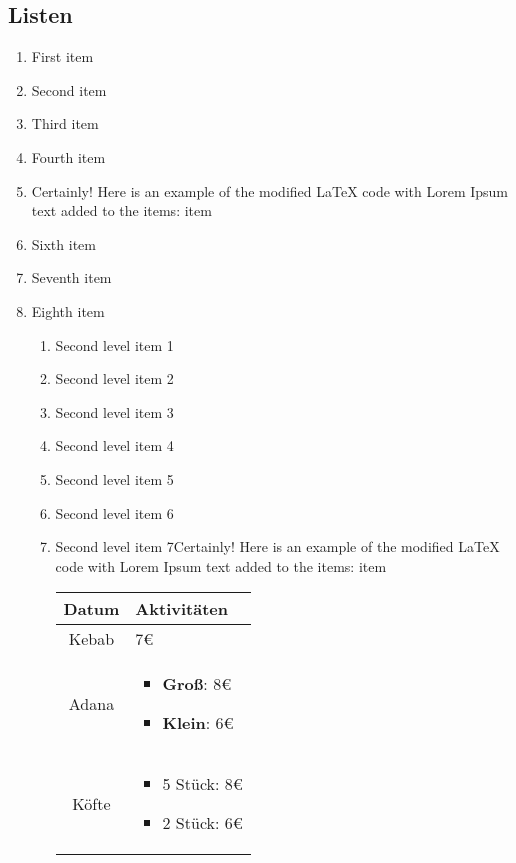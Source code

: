 \subsection{Listen}
\begin{enumerate}
    \item First item
    \item Second item
    \item Third item
    \item Fourth item
    \item Certainly! Here is an example of the modified LaTeX code with Lorem Ipsum text added to the items: item
    \item Sixth item
    \item Seventh item
    \item Eighth item
    \begin{enumerate}
        \item Second level item 1
        \item Second level item 2
        \item Second level item 3
        \item Second level item 4
        \item Second level item 5
        \item Second level item 6
        \item Second level item 7Certainly! Here is an example of the modified LaTeX code with Lorem Ipsum text added to the items: item
        \begin{center}
            \begin{table}[h]
            \centering
            \begin{tabular}{|c|p{6cm}|}
                \hline
                \textbf{Datum} & \textbf{Aktivitäten} \\
                \hline
                Kebab & 7€ \\
                \hline
                Adana & \begin{itemize}
                    \item \textbf{Groß}: 8€
                    \item \textbf{Klein}: 6€
                \end{itemize} \\
                \hline
                Köfte & \begin{itemize}
                    \item 5 Stück: 8€
                    \item 2 Stück: 6€
                \end{itemize}\\

\end{tabular}
\end{table}
\end{center}
\end{enumerate}
\end{enumerate}
